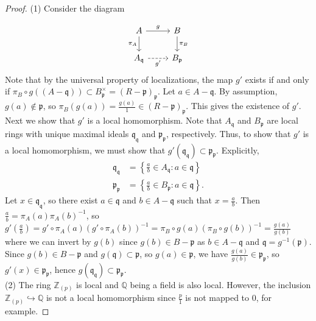 \documentclass[reqno]{amsart}
\theoremstyle{definition}
\theoremstyle{remark}
\begin{document}
\begin{proof}
    (1) Consider the diagram

    \begin{equation*}
    \begin{tikzcd}
        A \ar[d, "\pi_A"'] \ar[r, "g"] & B \ar[d, "\pi_B"] \\
        A_{\mathfrak{q}} \ar[r, "g'"', dashed] & B_{\mathfrak{p}}
    \end{tikzcd}
    \end{equation*}
    Note that
    by the universal property of localizations, 
    the map $g'$ exists if and only if
    $\pi_B \circ g \left( \left( A- \mathfrak{q} \right) 
    \right) \subset 
    B_{\mathfrak{p}}^{\times }
    = \left( R - \mathfrak{p} \right)_{\mathfrak{p}}$.
    Let 
    $a \in A - \mathfrak{q}$. By assumption, 
    $g (a) \not\in \mathfrak{p}$, so
    $\pi_B \left( g (a) \right) = \frac{g(a)}{1}
    \in \left( R - \mathfrak{p} \right)_{\mathfrak{p}} $.
    This gives the existence of $g'$.\\
    Next we show that
    $g'$ is a local homomorphism. 
    Note that $A_{\mathfrak{q}}$ and
    $B_{\mathfrak{p}}$ are local rings
    with unique maximal ideals
    $\mathfrak{q}_{\mathfrak{q}}$ and
    $\mathfrak{p}_{\mathfrak{p}}$, respectively. Thus, to
    show that $g'$ is a local homomorphism, we must show
    that $g' \left( \mathfrak{q}_{\mathfrak{q}} \right) 
    \subset \mathfrak{p}_{\mathfrak{p}}$.
    Explicitly, 
    \begin{align*}
        \mathfrak{q}_{\mathfrak{q}} &=
        \left\{ \frac{a}{b} \in A_{\mathfrak{q}} \colon
        a \in \mathfrak{q} \right\} \\
        \mathfrak{p}_{\mathfrak{p} } &=
        \left\{ \frac{a}{b} \in B_{\mathfrak{p}} \colon
        a \in \mathfrak{q} \right\} .
    \end{align*}
    Let $x \in 
    \mathfrak{q}_{\mathfrak{q}}$, so
    there exist $a \in \mathfrak{q}$ and
    $b \in A - \mathfrak{q}$ such that
    $x = \frac{a}{b}$.
    Then
    $\frac{a}{b} = \pi_A (a) \pi_A(b)^{-1}$, so
    $g' \left( \frac{a}{b} \right) 
    = g' \circ \pi_A (a) 
    \left( g' \circ \pi_A (b) \right)^{-1}
    = \pi_B \circ g(a) \left( \pi_B \circ g(b) \right)^{-1}
    = \frac{g(a)}{g(b)}$ where
    we can invert by $g(b)$ since
    $g(b) \in B - \mathfrak{p}$ as
    $b \in A - \mathfrak{q}$ and
    $\mathfrak{q} = g^{-1}\left( \mathfrak{p} \right) $.
    Since $g(b) \in B - \mathfrak{p}$ and
    $g\left( \mathfrak{q} \right) 
    \subset \mathfrak{p}$, 
    so $g(a) \in \mathfrak{p}$, we have
    $\frac{g(a)}{g(b)} \in 
    \mathfrak{p}_{\mathfrak{p}}$, so
    $g'(x) \in \mathfrak{p}_{\mathfrak{p}}$, hence
    $g\left( \mathfrak{q}_{\mathfrak{q}} \right) 
    \subset \mathfrak{p}_{\mathfrak{p}}$.
    \\
    \linebreak
    (2) 
The ring $\mathbb{Z}_{(p)}$ is local and 
$\mathbb{Q}$ being a field is also local. However,
the inclusion  $\mathbb{Z}_{(p)} \hookrightarrow
\mathbb{Q}$ is not a local homomorphism since
$\frac{p}{1}$ is not mapped to $0$, for example.
\end{proof}
\end{document}
